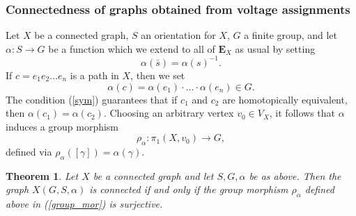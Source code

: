 \documentclass[11pt]{amsart}
\newtheorem{theorem}{Theorem}[section]
\numberwithin{equation}{section}
\theoremstyle{remark}
\begin{document}
\subsubsection{Connectedness of graphs obtained from voltage assignments} \label{conn1}
Let $X$ be a connected graph, $S$ an orientation for $X$, $G$ a finite group, and let $\alpha:S \rightarrow G$ be a function which we extend to all of $\mathbf{E}_{X}$ as usual by setting
\begin{equation} \label{sym}
\alpha(\bar{s}) = \alpha(s)^{-1}.    
\end{equation}
If $c = e_{1} e_{2}  \ldots  e_{n}$ is a path in $X$, then we set 
$$\alpha(c) = \alpha(e_{1}) \cdot \ldots \cdot \alpha(e_{n}) \in G. $$
The condition (\ref{sym}) guarantees that if $c_{1}$ and $c_{2}$ are homotopically equivalent, then $\alpha(c_{1}) = \alpha(c_{2})$.  Choosing an arbitrary vertex $v_{0} \in V_{X}$, it follows that $\alpha$ induces a group morphism
\begin{equation} \label{group_mor}
\rho_{\alpha}:\pi_{1}(X,v_{0}) \rightarrow G, 
\end{equation}
defined via $\rho_{\alpha}([\gamma]) = \alpha(\gamma)$.
\begin{theorem} \label{connectedness}
Let $X$ be a connected graph and let $S,G, \alpha$ be as above.  Then the graph $X(G,S,\alpha)$ is connected if and only if the group morphism $\rho_{\alpha}$ defined above in (\ref{group_mor}) is surjective.
\end{theorem}
\end{document}
